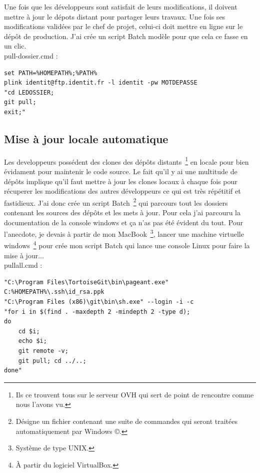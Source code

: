 Une fois que les développeurs sont satisfait de leurs modifications, il doivent
mettre à jour le dépots distant pour partager leurs travaux. Une fois ses
modifications validées par le chef de projet, celui-ci doit mettre en ligne sur
le dépôt de production. J'ai crée un script Batch \og{} modèle \fg{} pour que
cela ce fasse en un clic.\\
pull-dossier.cmd :
\begin{lstlisting}
set PATH=%HOMEPATH%;%PATH%
plink identit@ftp.identit.fr -l identit -pw MOTDEPASSE
"cd LEDOSSIER;
git pull;
exit;"
\end{lstlisting}


\subsection{Mise à jour locale automatique} %

Les developpeurs possédent des clones des dépôts distants\, \footnote{Ils ce
trouvent tous sur le serveur OVH qui sert de point de rencontre comme nous
l'avons vu.} en locale pour bien évidament pour maintenir le code source. Le
fait qu'il y ai une multitude de dépôts implique qu'il faut mettre à jour les
clones locaux à chaque fois pour récuperer les modifications des autres
développeurs ce qui est très répétitif et fastidieux. J'ai donc crée un script
Batch\, \footnote{Désigne un fichier contenant une suite de commandes qui
seront traitées automatiquement par Windows \copyright.} qui parcours tout les
dossiers contenant les sources des dépôts et les mets à jour. Pour cela j'ai
parcouru la documentation de la console windows et ça n'as pas été évident du
tout. Pour l'anecdote, je devais à partir de mon MacBook\, \footnote{Système de
type UNIX.}, lancer une machine virtuelle windows\, \footnote{À partir du
logiciel VirtualBox.} pour crée mon script Batch qui lance une console Linux
pour faire la mise à jour...\\
pullall.cmd :
\begin{lstlisting}
"C:\Program Files\TortoiseGit\bin\pageant.exe"
C:%HOMEPATH%\.ssh\id_rsa.ppk
"C:\Program Files (x86)\git\bin\sh.exe" --login -i -c
"for i in $(find . -maxdepth 2 -mindepth 2 -type d);
do
    cd $i;
    echo $i;
    git remote -v;
    git pull; cd ../..;
done"
\end{lstlisting}

\clearpage
